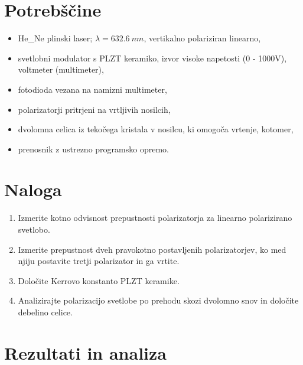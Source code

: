 \documentclass[12pt]{article}
\begin{document}
\section{Potrebščine}

\begin{itemize}
    \item He_Ne plinski laser; $\lambda = 632.6\ nm$, vertikalno polariziran linearno,
    \item svetlobni modulator s PLZT keramiko, izvor visoke napetosti (0 - 1000V), voltmeter (multimeter),
    \item fotodioda vezana na namizni multimeter,
    \item polarizatorji pritrjeni na vrtljivih nosilcih,
    \item dvolomna celica iz tekočega kristala v nosilcu, ki omogoča vrtenje, kotomer,
    \item prenosnik z ustrezno programsko opremo.
\end{itemize}

\section{Naloga}
\begin{enumerate}
    \item Izmerite kotno odvisnost prepustnosti polarizatorja za linearno polarizirano svetlobo.
    \item Izmerite prepustnost dveh pravokotno postavljenih polarizatorjev, ko med njiju postavite tretji polarizator in ga vrtite.
    \item Določite Kerrovo konstanto PLZT keramike.
    \item Analizirajte polarizacijo svetlobe po prehodu skozi dvolomno snov in določite debelino celice.
\end{enumerate}


\section{Rezultati in analiza}
\end{document}
